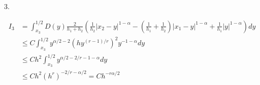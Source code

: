 \documentclass{ctexart}
\begin{document}
3.

\begin{equation}
    \begin{aligned}
        I_3 &= \int_{x_3}^{1/2}D(y) \frac{2}{h_1 + h_{2}} 
        ( \frac{1}{h_{2}} |x_{2}-y|^{1-\alpha} 
        - (\frac{1}{h_{1}}+\frac{1}{h_{2}}) |x_{1}-y|^{1-\alpha}
        +  \frac{1}{h_{1}}|y|^{1-\alpha} )  dy      \\
        &\le C \int_{x_3}^{1/2} y^{\alpha/2-2} (h y^{(r-1)/r})^2 y^{-1-\alpha} dy \\
        &\le C h^2 \int_{x_3}^{1/2} y^{\alpha/2 - 2/r -1 - \alpha} dy       \\
        &\le C h^2 (h^r)^{-2/r-\alpha/2} = C h^{-r\alpha/2}
    \end{aligned}
\end{equation}
\end{document}

